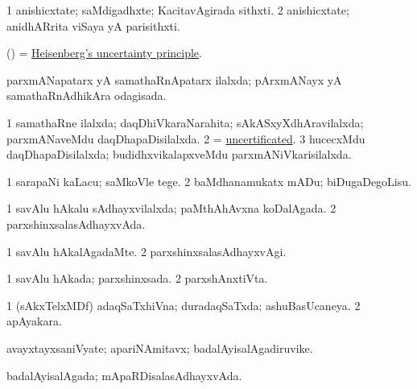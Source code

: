 \bentry
{} 
\gl{\nA}
\bmng
\bnum
\num{1} anishicxtate; saMdigadhxte; KacitavAgirada sithxti. 
\num{2} anishicxtate; anidhARrita viSaya yA parisithxti. 
\enum
\emng
\eentry

\bentry
{}
\gl{\nA}
\expl{}
\bmng
(\Bwvi) = \hyperref{kandict_h.pdf}{H}{Heisenberg's uncertainty principle}{Heisenberg's uncertainty principle}. 
\emng
\eentry

\bentry
{} 
\gl{\gu}
\expl{}
\bmng
parxmANapatarx yA samathaRnApatarx ilalxda; pArxmANayx yA samathaRnAdhikAra odagisada. 
\emng
\eentry

\bentry
{} 
\gl{\gu}
\expl{}
\bmng
\bnum
\num{1} samathaRne ilalxda; daqDhiVkaraNarahita; sAkASxyXdhAravilalxda; parxmANaveMdu daqDhapaDisilalxda. 
\num{2} = \hyperlink{uncertificated}{uncertificated}. 
\num{3} hucecxMdu daqDhapaDisilalxda; budidhxvikalapxveMdu parxmANiVkarisilalxda. 
\enum
\emng
\eentry

\bentry
{} 
\gl{\sakirx}
\expl{}
\bmng
\bnum
\num{1} sarapaNi kaLacu; saMkoVle tege. 
\num{2} baMdhanamukatx mADu; biDugaDegoLisu. 
\enum
\emng
\eentry

\bentry
{} 
\gl{\gu}
\expl{}
\bmng
\bnum
\num{1} savAlu hAkalu sAdhayxvilalxda; paMthAhAvxna koDalAgada. 
\num{2} parxshinxsalasAdhayxvAda. 
\enum
\emng
\eentry

\bentry
{} 
\gl{\kirxvi}
\expl{}
\bmng
\bnum
\num{1} savAlu hAkalAgadaMte. 
\num{2} parxshinxsalasAdhayxvAgi. 
\enum
\emng
\eentry

\bentry
{} 
\gl{\gu}
\expl{}
\bmng
\bnum
\num{1} savAlu hAkada; parxshinxsada. 
\num{2} parxshAnxtiVta. 
\enum
\emng
\eentry

\bentry
{} 
\gl{\gu}
\bmng
\bnum
\num{1} (sAkxTelxMDf) adaqSaTxhiVna; duradaqSaTxda; ashuBasUcaneya. 
\num{2} apAyakara. 
\enum
\emng
\eentry

\bentry
{} 
\gl{\nA}
\expl{}
\bmng
avayxtayxsaniVyate; apariNAmitavx; badalAyisalAgadiruvike. 
\emng
\eentry

\bentry
{} 
\gl{\gu}
\expl{}
\bmng
badalAyisalAgada; mApaRDisalasAdhayxvAda. 
\emng
\eentry

